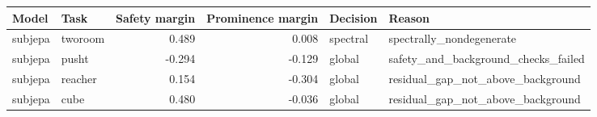 \begin{tabular}{llrrll}
\toprule
Model & Task & Safety margin & Prominence margin & Decision & Reason \\
\midrule
subjepa & tworoom & 0.489 & 0.008 & spectral & spectrally\_nondegenerate \\
subjepa & pusht & -0.294 & -0.129 & global & safety\_and\_background\_checks\_failed \\
subjepa & reacher & 0.154 & -0.304 & global & residual\_gap\_not\_above\_background \\
subjepa & cube & 0.480 & -0.036 & global & residual\_gap\_not\_above\_background \\
\bottomrule
\end{tabular}
